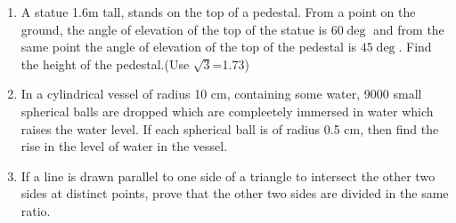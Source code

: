 \begin{enumerate}
\begin{figure}[H]
                 \caption{}
                 \label{}
          \end{figure}
\item A statue 1.6m tall, stands on the top of a pedestal. From a point on the ground, the angle of elevation of the top of the statue is $60\deg$ and from the same point the angle of elevation of the top of the pedestal is $45\deg$. Find the height of the pedestal.(Use $\sqrt{
    3}$=1.73)
\item In a cylindrical vessel of radius 10 cm, containing some water, 9000 small spherical balls are dropped which are compleetely immersed in water which raises the water level. If each spherical ball is of radius 0.5 cm, then find the rise in the level of water in the vessel.
\item If a line is drawn parallel to one side of a triangle to intersect the other two sides at distinct points, prove that the other two sides are divided in the same ratio.		
\end{enumerate}
